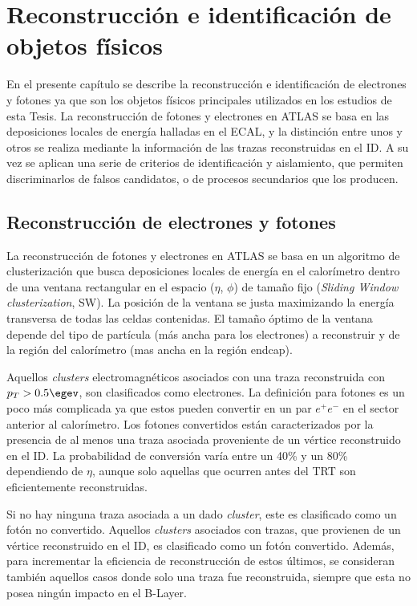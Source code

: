 \chapter{Reconstrucción e identificación de objetos físicos}



En el presente capítulo se describe la reconstrucción e identificación de electrones y fotones ya que son los objetos físicos principales utilizados en los estudios de esta Tesis. La reconstrucción de fotones y electrones en ATLAS se basa en las deposiciones locales de energía halladas en el ECAL, y la distinción entre unos y otros se   realiza mediante la información de las trazas reconstruidas en el ID. A su vez se aplican una serie de criterios de identificación y aislamiento, que permiten discriminarlos de falsos candidatos, o de procesos secundarios que los producen.

\section{Reconstrucción de electrones y fotones}

La  reconstrucción de fotones y electrones en ATLAS se basa en un algoritmo de clusterización \cite{Lampl:1099735} que busca deposiciones locales de energía en el calorímetro dentro de una ventana rectangular en el espacio ($\eta$, $\phi$) de tamaño fijo (\textit{Sliding Window clusterization}, SW). La posición de la ventana se  justa maximizando la energía transversa de todas las celdas contenidas. El tamaño óptimo de la ventana depende del tipo de partícula (más ancha para los electrones) a reconstruir y de la región del calorímetro (mas ancha en la región endcap). 

Aquellos \textit{clusters} electromagnéticos asociados con una traza reconstruida con $p_{T} > 0.5 \egev$, son clasificados como electrones. La definición para fotones es un poco más complicada ya que estos pueden convertir en un par $e^{+}e^{-}$ en el sector anterior al calorímetro. Los fotones convertidos están caracterizados por la presencia de al menos una traza asociada proveniente de un vértice reconstruido en el ID. La probabilidad de conversión varía entre un 40\% y un 80\% dependiendo de $\eta$, aunque solo aquellas que ocurren antes del TRT son eficientemente reconstruidas. 

Si no hay ninguna traza asociada a un dado \textit{cluster}, este es clasificado como un fotón no convertido. Aquellos \textit{clusters} asociados con trazas, que provienen de un vértice reconstruido en el ID, es clasificado como un fotón convertido. Además, para incrementar la eficiencia de reconstrucción de estos últimos, se consideran también aquellos casos donde solo una traza fue reconstruida, siempre que esta no posea ningún impacto en el B-Layer.

